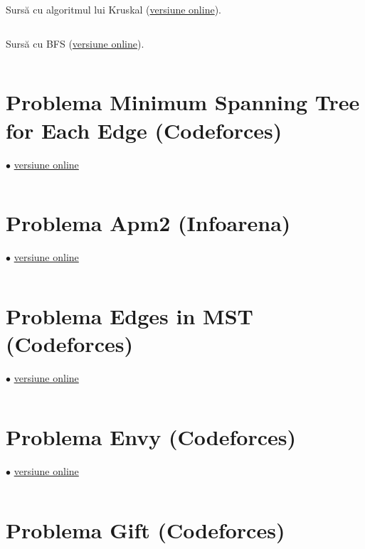 \documentclass[../main.tex]{subfiles}
\begin{document}
Sursă cu algoritmul lui Kruskal (\href{https://codeforces.com/contest/1242/submission/305597262}{versiune online}).

\inputminted{cpp}{../src/graphs/0-1-mst-kruskal.cpp}

Sursă cu BFS (\href{https://codeforces.com/contest/1242/submission/241672359}{versiune online}).

\inputminted{cpp}{../src/graphs/0-1-mst-bfs.cpp}

\section{Problema Minimum Spanning Tree for Each Edge (Codeforces)}
\label{code:mst-for-each-edge}
$\bullet$
\href{https://codeforces.com/contest/609/submission/305437693}{versiune online}

\inputminted{cpp}{../src/graphs/mst-for-each-edge.cpp}

\section{Problema Apm2 (Infoarena)}
\label{code:apm2}
$\bullet$
\href{https://infoarena.ro/job_detail/3193362?action=view-source}{versiune online}

\inputminted{cpp}{../src/graphs/apm2.cpp}

\section{Problema Edges in MST (Codeforces)}
\label{code:edges-in-mst}
$\bullet$
\href{https://codeforces.com/contest/160/submission/305459272}{versiune online}

\inputminted{cpp}{../src/graphs/edges-in-mst.cpp}

\section{Problema Envy (Codeforces)}
\label{code:envy}
$\bullet$
\href{https://codeforces.com/contest/891/submission/366364527}{versiune online}

\inputminted{cpp}{../src/graphs/envy.cpp}

\section{Problema Gift (Codeforces)}
\label{code:gift}
\end{document}
